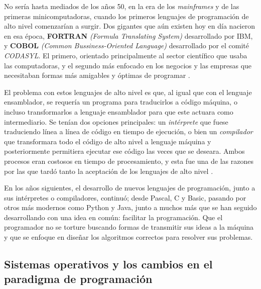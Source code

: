 \documentclass[letterpaper,12pt,oneside]{book}
\begin{document}
		No sería hasta mediados de los años 50, en la era de los \textit{mainframes} y de las primeras minicomputadoras, cuando los primeros lenguajes de programación
		de alto nivel comenzarían a surgir. Dos gigantes que aún existen hoy en día nacieron en esa época, \textbf{FORTRAN} \textit{(Formula Translating 
		System)} desarrollado por IBM, y
		\textbf{COBOL} \textit{(Common Bussiness-Oriented Language)} desarrollado por el comité \textit{CODASYL}. El primero, orientado principalmente al sector científico que usaba
		las computadoras, y el segundo más enfocado en los negocios y las empresas que necesitaban formas más amigables y óptimas de programar \cite{oregan_brief_2012}.

        El problema con estos lenguajes de alto nivel es que, al igual que con el lenguaje ensamblador, se requería un programa
para traducirlos a código máquina, o incluso transformarlos a lenguaje ensamblador para que este actuara como intermediario. Se tenían dos opciones principales:
un \textit{intérprete} que fuese traduciendo línea a línea de código en tiempo de ejecución, o bien un \textit{compilador} que transformara todo el código de alto nivel a lenguaje máquina y posteriormente permitiera ejecutar ese código las veces que se deseara. Ambos
procesos eran costosos en tiempo de procesamiento, y esta fue una de las razones por las que tardó tanto la aceptación de los lenguajes de alto nivel
        \cite{oregan_brief_2012}.
		
		
		En los años siguientes, el desarrollo de nuevos lenguajes de programación, junto a sus intérpretes o compiladores, continuó; desde Pascal, C y Basic, pasando por otros más modernos 
		como Python y Java, junto a muchos más que
		se han seguido desarrollando con una idea en común: facilitar la programación. Que el programador no se torture buscando formas de transmitir sus
		ideas a la máquina y que se enfoque en diseñar los algoritmos correctos para resolver sus problemas.
		


		\clearpage
		\subsection{Sistemas operativos y los cambios en el paradigma de programación}
		
\end{document}
